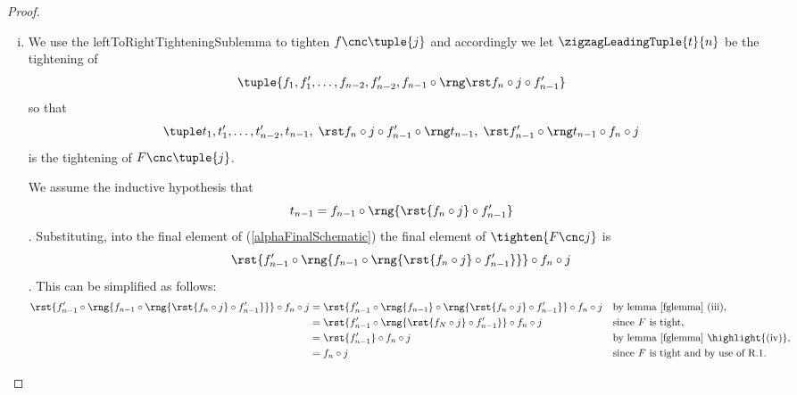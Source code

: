 \begin{proof}
\begin{enumerate}[(i)]
\begin{align*}
i\circ f_1\circ
\rng{\rst{\inductivets}\circ f'_1}
&=
i\circ f_1\circ
\rng{
 \rst{f'_1\circ\rng{i\circ f_1}}
 \circ \rst{f_2}
 \circ f'_1
}
&&\mbox{by R.3,} \\
&=
i\circ f_1\circ
\rng{
 \rst{f'_1\circ\rng{i\circ f_1}}
 \circ f'_1
}
&&\mbox{since $F$ is tight and by R.1,} \\
&=
i\circ f_1\circ
\rng{
 f'_1\circ\rst{\rng{i\circ f_1}}
}
&&\mbox{by R.4,} \\
&=
i\circ f_1\circ
\rng{f'_1}\circ\rst{\rng{i\circ f_1}}
&&\mbox{by RR.3,} \\
&=
i\circ f_1\circ
\rng{f'_1}\circ\rng{i\circ f_1}
&&\mbox{by RR.1.}\\
&=
i\circ f_1\circ
\rng{f_1}\circ\rng{i\circ f_1}
&&\mbox{since $F$ is tight,} \\
&=
i\circ f_1\circ
\rng{i\circ f_1}
&&\mbox{by RR.2,} \\
&=
i\circ f_1
&&\mbox{by RR.2, again and as required.}
\end{align*}
\item %
We use the leftToRightTighteningSublemma to tighten 
$f \cnc \tuple{j}$ and accordingly 
we let $\zigzagLeadingTuple{t}{n}$
be the tightening of
\[
\tuple{\tightlead[j]}
\]
so that 
\begin{equation}
\label{alphaFinalSchematic}
\leftToRightTightening[j]
\end{equation}
is the tightening of $F \cnc \tuple{j}$. 

We assume the inductive hypothesis that
\newcommand{\inductivetp}
{f_{n-1} \circ \rng{\rst{f_n \circ j} \circ f'_{n-1}}}
\[
t_{n-1} = \inductivetp
\]. Substituting, into the final element of
(\ref{alphaFinalSchematic})
the final element of $\tighten{F \cnc j}$
is 
\[
\rst{f'_{n-1} \circ \rng{\inductivetp}} \circ f_n \circ j 
\]. This can be simplified as follows:
\begin{align*}
\rst{f'_{n-1} \circ \rng{\inductivetp}} \circ f_n \circ j
  &= \rst{f'_{n-1} \circ \rng{f_{n-1}} 
               \circ \rng{\rst{f_n \circ j}\circ f'_{n-1}}} 
                     \circ f_n \circ j
     && \mbox{by lemma \ref{fglemma} (iii),} \\
  &= \rst{f'_{n-1} 
               \circ \rng{\rst{f_N \circ j}\circ f'_{n-1}}} 
                     \circ f_n \circ j
     && \mbox{since $F$ is tight,} \\
  &= \rst{f'_{n-1}} \circ f_n \circ j
     && \mbox{by lemma \ref{fglemma} \highlight{(iv)}, } \\
  &= f_n \circ j
     && \mbox{since $F$ is tight and by use of R.1.} 
\end{align*}
\end{enumerate}
\end{proof}
